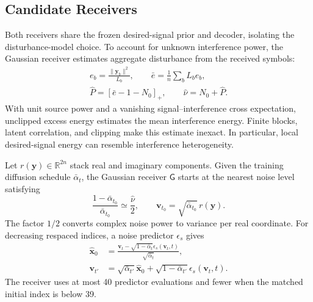 \documentclass[conference]{IEEEtran}
\newcommand{\R}{\mathbb{R}}
\newcommand{\pos}[1]{[#1]_+}
\newcommand{\norm}[1]{\lVert#1\rVert}
\newcommand{\G}{\mathsf{G}}
\begin{document}
\subsection{Candidate Receivers}
Both receivers share the frozen desired-signal prior and decoder, isolating
the disturbance-model choice. To account for unknown interference power, the
Gaussian receiver estimates aggregate disturbance from the received symbols:
\begin{equation}
 \begin{gathered}
 e_b=\frac{\norm{\bm y_b}^2}{L_b},\qquad
 \bar e=\frac{1}{n}\sum_b L_be_b,\\
 \widehat P=\pos{\bar e-1-N_0},\qquad
 \widehat\nu=N_0+\widehat P.
 \end{gathered}
 \label{eq:energy}
\end{equation}
With unit source power and a vanishing signal--interference cross expectation,
unclipped excess energy estimates the mean interference energy. Finite blocks,
latent correlation, and clipping make this estimate inexact. In particular,
local desired-signal energy can resemble interference heterogeneity.

Let $r(\bm y)\in\R^{2n}$ stack real and imaginary components. Given the training
diffusion schedule $\bar\alpha_t$, the Gaussian receiver $\G$ starts at the
nearest noise level satisfying
\begin{equation}
 \frac{1-\bar\alpha_{t_0}}{\bar\alpha_{t_0}}
 \simeq\frac{\widehat\nu}{2},\qquad
 \bm v_{t_0}=\sqrt{\bar\alpha_{t_0}}\,r(\bm y).
 \label{eq:match}
\end{equation}
The factor $1/2$ converts complex noise power to variance per real coordinate.
For decreasing respaced indices, a noise predictor $\epsilon_s$ gives
\begin{align}
 \widehat{\bm x}_0&=
 \frac{\bm v_t-\sqrt{1-\bar\alpha_t}\epsilon_s(\bm v_t,t)}
 {\sqrt{\bar\alpha_t}},\\
 \bm v_{t'}&=\sqrt{\bar\alpha_{t'}}\widehat{\bm x}_0+
 \sqrt{1-\bar\alpha_{t'}}\epsilon_s(\bm v_t,t).
 \label{eq:gaussian_update}
\end{align}
The receiver uses at most 40 predictor evaluations and fewer when the matched
initial index is below 39.
\end{document}
